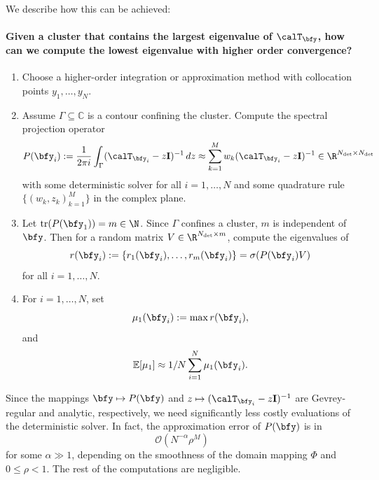 We describe how this can be achieved:
\paragraph{Given a cluster that contains the largest eigenvalue of $\calT_\bfy$, how can we compute the lowest eigenvalue with higher order convergence?}
    \begin{enumerate}
    \item Choose a higher-order integration or approximation method with collocation points $y_1, \ldots, y_N$.
        \item Assume $\Gamma \subseteq \mathbb{C}$ is a contour confining the cluster. Compute the spectral projection operator 
\begin{align*}
                P(\bfy_i ) := \frac 1 {2\pi i} \int_{\Gamma} (\calT_{\bfy_i} - z \mathbf{I})^{-1}  \mathop{dz} \approx \sum_{k = 1}^{M} w_k (\calT_{\bfy_i} - z \mathbf{I})^{-1}  \in \R^{N_{\text{det}} \times  N_{\text{det}}}
        \end{align*}
        with some deterministic solver
        for all $i = 1, \ldots, N$ and some quadrature rule $ \{(w_k, z_k)_{k=1}^M \}$ in the complex plane.
        \item Let $\mathrm{tr}(P(\bfy_1)) = m \in \N$. Since $\Gamma$ confines a cluster, $m$ is independent of $\bfy$. Then for a random matrix $V \in \R^{N_{\text{det}} \times m}$, compute the eigenvalues of 
        \begin{equation*}
           r(\bfy_i) :=  \{ r_1(\bfy_i), \ldots, r_m(\bfy_i) \} = \sigma(P(\bfy_i) V)         
        \end{equation*}
        for all $i = 1,\ldots,N$.
        \item For $i=1,\ldots,N$, set \begin{equation*}
            \mu_1(\bfy_i) := \max r(\bfy_i),
        \end{equation*} 
        and
        \begin{equation*}
        \mathbb{E}[\mu_1] \approx 1/N\sum_{i=1}^N \mu_1(\bfy_i).
        \end{equation*} 
    \end{enumerate}
    \begin{remark}
        Since the mappings $\bfy \mapsto P(\bfy)$ and $z \mapsto (\calT_{\bfy_i} - z \mathbf{I})^{-1}$ are Gevrey-regular and analytic, respectively, we need significantly less costly evaluations of the deterministic solver. In fact, the approximation error of $P(\bfy)$ is in 
        \begin{equation*}
            \mathcal O(N^{-\alpha} \rho^{M})
        \end{equation*} for some $\alpha \gg 1$, depending on the smoothness of the domain mapping $\Phi$ and $0 \leq \rho < 1$. 
        The rest of the computations are negligible.
    \end{remark}



